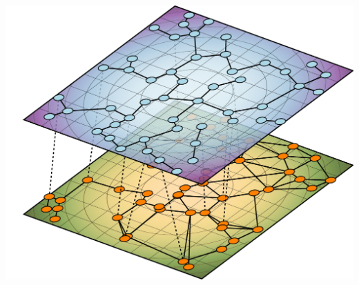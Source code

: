 \begin{titlepage}
	\vspace{2cm}
	
	\includegraphics[width=15cm]{../frontespizio/figure.pdf}
	
	\vspace{2cm}
	
	\vfill %
	
%	
%	
%	
%	

\end{titlepage}

\clearpage{\pagestyle{empty}\cleardoublepage}
